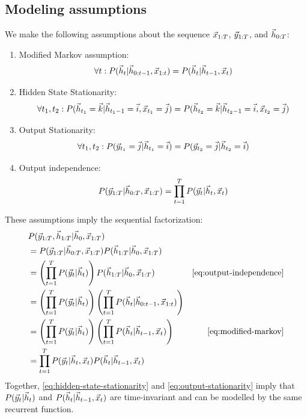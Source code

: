 \subsection{Modeling assumptions}


We make the following assumptions about the sequence $\vec{x}_{1:T}$, $\vec{y}_{1:T}$, and $\vec{h}_{0:T}$:
\begin{enumerate}
  \item Modified Markov assumption:
    \begin{equation}
      \label{eq:modified-markov}
      \forall t: P(\vec{h}_t | \vec{h}_{0:t-1}, \vec{x}_{1:t}) = P(\vec{h}_t | \vec{h}_{t-1}, \vec{x}_t)
    \end{equation}
  \item Hidden State Stationarity:
    \begin{equation}
      \label{eq:hidden-state-stationarity}
      \forall t_1, t_2: P(\vec{h}_{t_1} = \vec{k} | \vec{h}_{t_{1}-1} = \vec{i}, \vec{x}_{t_1} = \vec{j}) = P(\vec{h}_{t_2} = \vec{k} | \vec{h}_{t_{2}-1} = \vec{i}, \vec{x}_{t_2} = \vec{j})
   \end{equation}
  \item Output Stationarity:
    \begin{equation}
      \label{eq:output-stationarity}
      \forall t_1, t_2: P(\vec{y}_{t_1} = \vec{j} | \vec{h}_{t_1} = \vec{i}) = P(\vec{y}_{t_2} = \vec{j} | \vec{h}_{t_2} = \vec{i})
   \end{equation}
  \item Output independence:
   \begin{equation}
     \label{eq:output-independence}
     P(\vec{y}_{1:T} | \vec{h}_{0:T}, \vec{x}_{1:T}) = \prod_{t=1}^T P(\vec{y}_t | \vec{h}_{t}, \vec{x}_t)
   \end{equation}
\end{enumerate}

These assumptions imply the sequential factorization:
\begin{align}
  &P(\y_{1:T}, \h_{1:T} | \h_0, \x_{1:T})  &\\
  &= P(\y_{1:T} | \h_{0:T}, \x_{1:T}) P(\h_{1:T} | \h_0, \x_{1:T})  &\\
  &= \left( \prod_{t=1}^T P(\y_t | \h_t) \right) P(\h_{1:T}| \h_0, \x_{1:T}) &\text{\cref{eq:output-independence}}\\
  &= \left( \prod_{t=1}^T P(\y_t | \h_t) \right) \left(\prod_{t=1}^T P(\h_{t}| \h_{0:t-1}, \x_{1:t})\right) &\\
  &= \left( \prod_{t=1}^T P(\y_t | \h_t) \right) \left(\prod_{t=1}^T P(\h_{t}| \h_{t-1}, \x_{t})\right) &\text{\cref{eq:modified-markov}}\\
  &= \prod_{t=1}^T P(\y_t | \h_t, \x_t) P(\h_{t}| \h_{t-1}, \x_{t}) & \\
\end{align}
Together, \cref{eq:hidden-state-stationarity} and \cref{eq:output-stationarity} imply that $P(\vec{y}_t | \vec{h}_t)$
and $P(\vec{h}_{t}| \vec{h}_{t-1}, \vec{x}_{t})$ are time-invariant and can be modelled by the same recurrent function.


